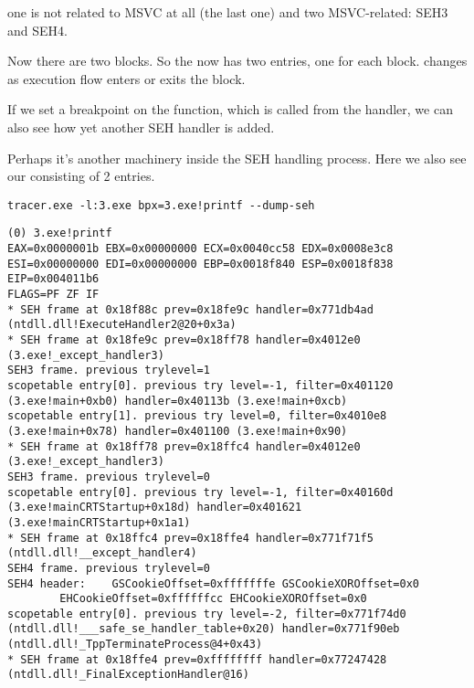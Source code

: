 one is not related to MSVC at all (the last one) and two MSVC-related: SEH3 and SEH4.




Now there are two  blocks.
So the  now has two entries, one for each block.
 changes as execution flow enters or exits the  block.



If we set a breakpoint on the \printf{} function, which is called from the handler, 
we can also see how yet another SEH handler is added.

Perhaps it's another machinery inside the SEH handling process.
Here we also see our  consisting of 2 entries.

\begin{lstlisting}
tracer.exe -l:3.exe bpx=3.exe!printf --dump-seh
\end{lstlisting}

\begin{lstlisting}[caption=tracer.exe output]
(0) 3.exe!printf
EAX=0x0000001b EBX=0x00000000 ECX=0x0040cc58 EDX=0x0008e3c8
ESI=0x00000000 EDI=0x00000000 EBP=0x0018f840 ESP=0x0018f838
EIP=0x004011b6
FLAGS=PF ZF IF
* SEH frame at 0x18f88c prev=0x18fe9c handler=0x771db4ad (ntdll.dll!ExecuteHandler2@20+0x3a)
* SEH frame at 0x18fe9c prev=0x18ff78 handler=0x4012e0 (3.exe!_except_handler3)
SEH3 frame. previous trylevel=1
scopetable entry[0]. previous try level=-1, filter=0x401120 (3.exe!main+0xb0) handler=0x40113b (3.exe!main+0xcb)
scopetable entry[1]. previous try level=0, filter=0x4010e8 (3.exe!main+0x78) handler=0x401100 (3.exe!main+0x90)
* SEH frame at 0x18ff78 prev=0x18ffc4 handler=0x4012e0 (3.exe!_except_handler3)
SEH3 frame. previous trylevel=0
scopetable entry[0]. previous try level=-1, filter=0x40160d (3.exe!mainCRTStartup+0x18d) handler=0x401621 (3.exe!mainCRTStartup+0x1a1)
* SEH frame at 0x18ffc4 prev=0x18ffe4 handler=0x771f71f5 (ntdll.dll!__except_handler4)
SEH4 frame. previous trylevel=0
SEH4 header:	GSCookieOffset=0xfffffffe GSCookieXOROffset=0x0
		EHCookieOffset=0xffffffcc EHCookieXOROffset=0x0
scopetable entry[0]. previous try level=-2, filter=0x771f74d0 (ntdll.dll!___safe_se_handler_table+0x20) handler=0x771f90eb (ntdll.dll!_TppTerminateProcess@4+0x43)
* SEH frame at 0x18ffe4 prev=0xffffffff handler=0x77247428 (ntdll.dll!_FinalExceptionHandler@16)
\end{lstlisting}

